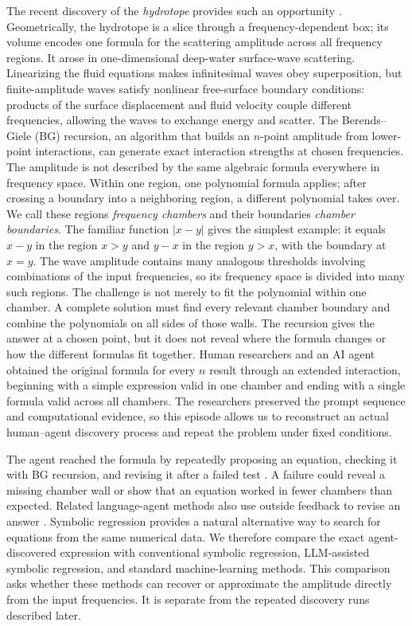 \documentclass{article}
\begin{document}
The recent discovery of the \emph{hydrotope} provides such an opportunity
\citep{Arkani-Hamed2026SurfaceWW}. Geometrically, the hydrotope is a slice
through a frequency-dependent box; its volume encodes one formula for the
scattering amplitude across all frequency regions. It arose in one-dimensional
deep-water surface-wave scattering. Linearizing the fluid equations makes
infinitesimal waves obey superposition, but finite-amplitude
waves satisfy nonlinear free-surface boundary conditions: products of the
surface displacement and fluid velocity couple different frequencies, allowing
the waves to exchange energy and scatter. The Berends--Giele (BG) recursion, an
algorithm that builds an $n$-point amplitude from lower-point interactions, can
generate exact interaction strengths at chosen frequencies.
The amplitude is not described by the same algebraic formula everywhere in
frequency space. Within one
region, one polynomial formula applies; after crossing a boundary into a
neighboring region, a different polynomial takes over. We call these regions
\emph{frequency chambers} and their boundaries \emph{chamber boundaries}. The
familiar function $|x-y|$ gives the simplest example: it equals $x-y$ in the
region $x>y$ and $y-x$ in the region $y>x$, with the boundary at $x=y$. The wave
amplitude contains many analogous thresholds involving combinations of the
input frequencies, so its frequency space is divided into many such regions.
The challenge is not merely to fit the polynomial within one chamber. A
complete solution must find every relevant chamber boundary and combine the
polynomials on all sides of those walls. The recursion gives the answer at a
chosen point, but it does not reveal where the formula changes or how the
different formulas fit together.
Human researchers and an AI agent obtained the original formula for every $n$
result through an extended interaction, beginning with a simple expression
valid in one chamber and ending with a single formula valid across all
chambers. The researchers preserved the prompt sequence and computational
evidence, so this episode allows us to reconstruct an actual human--agent
discovery process and repeat the problem under fixed conditions.

The agent reached the formula by repeatedly proposing an equation, checking it
with BG recursion, and revising it after a failed test
\citep{Arkani-Hamed2026SurfaceWW}. A failure could reveal a missing chamber
wall or show that an equation worked in fewer chambers than expected. Related
language-agent methods also use outside feedback to revise an answer
\citep{madaan2023selfrefine,Shinn2023Reflexion,Gou2024CRITIC,Wu2024ProCo}. Symbolic regression provides a natural alternative
way to search for equations from the same numerical data. We therefore compare
the exact agent-discovered expression with conventional symbolic regression,
LLM-assisted symbolic regression, and standard machine-learning methods. This
comparison asks whether these methods can recover or approximate the amplitude
directly from the input frequencies. It is separate from the repeated
discovery runs described later.
\end{document}
